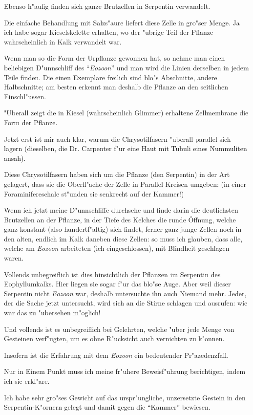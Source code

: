 \documentclass[a4paper, 11pt, oneside, german]{article}
\begin{document}
Ebenso h"aufig finden sich ganze Brutzellen in Serpentin verwandelt.

Die einfache Behandlung mit Salzs"aure liefert diese Zelle in gro"ser Menge. Ja ich habe sogar Kieselskelette erhalten, wo der "ubrige Teil der Pflanze wahrscheinlich in Kalk verwandelt war.

Wenn man so die Form der Urpflanze gewonnen hat, so nehme man einen beliebigen D"unnschliff des "`\emph{Eozoon}"' und man wird die Linien derselben in jedem Teile finden. Die einen Exemplare freilich sind blo"s Abschnitte, andere Halbschnitte; am besten erkennt man deshalb die Pflanze an den seitlichen Einschl"ussen.

"Uberall zeigt die in Kiesel (wahrscheinlich Glimmer) erhaltene Zellmembrane die Form der Pflanze.

Jetzt erst ist mir auch klar, warum die Chrysotilfasern "uberall parallel sich lagern (dieselben, die Dr. Carpenter f"ur eine Haut mit Tubuli eines Nummuliten ansah).

Diese Chrysotilfasern haben sich um die Pflanze (den Serpentin) in der Art gelagert, dass sie die Oberfl"ache der Zelle in Parallel-Kreisen umgeben: (in einer Foraminifereschale st"unden sie senkrecht auf der Kammer!)

Wenn ich jetzt meine D"unnschliffe durchsehe und finde darin die deutlichsten Brutzellen an der Pflanze, in der Tiefe des Kelches die runde Öffnung, welche ganz konstant (also hundertf"altig) sich findet, ferner ganz junge Zellen noch in den alten, endlich im Kalk daneben diese Zellen: so muss ich glauben, dass alle, welche am \emph{Eozoon} arbeiteten (ich eingeschlossen), mit Blindheit geschlagen waren.

Vollends unbegreiflich ist dies hinsichtlich der Pflanzen im Serpentin des Eophyllumkalks. Hier liegen sie sogar f"ur das blo"se Auge. Aber weil dieser Serpentin nicht \emph{Eozoon} war, deshalb untersuchte ihn auch Niemand mehr. Jeder, der die Sache jetzt untersucht, wird sich an die Stirne schlagen und ausrufen: wie war das zu "ubersehen m"oglich!

Und vollends ist es unbegreiflich bei Gelehrten, welche "uber jede Menge von Gesteinen verf"ugten, um es ohne R"ucksicht auch vernichten zu k"onnen.

Insofern ist die Erfahrung mit dem \emph{Eozoon} ein bedeutender Pr"azedenzfall.

Nur in Einem Punkt muss ich meine fr"uhere Beweisf"uhrung berichtigen, indem ich sie erkl"are.

Ich habe sehr gro"ses Gewicht auf das urspr"ungliche, unzersetzte Gestein in den Serpentin-K"ornern gelegt und damit gegen die "`Kammer"' bewiesen.
\end{document}
